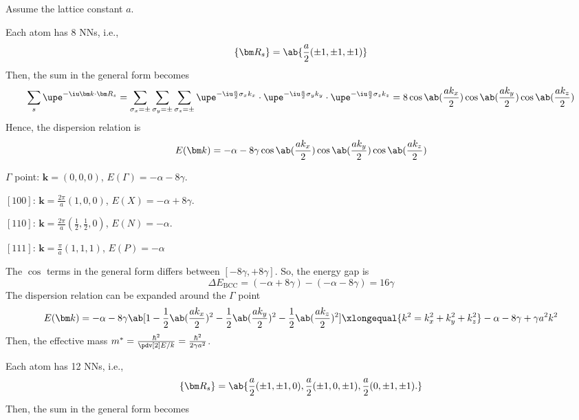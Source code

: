 \begin{solution}[$\text{i} = \text{BCC}$, $\text{ii} = \text{FCC}$]
  Assume the lattice constant $a$.
   \setcounter{case}{1}
  \begin{enumext}[label = (\alph*\textsubscript{\roman{case}})]
    \item Each atom has 8 NNs, i.e.,
    \[
      \{\bm R_s\} = \ab\{\frac a2(\pm1, \pm1, \pm1)\}
    \]
    Then, the sum in the general form becomes
    \[
      \sum_s \upe^{-\iu \bm k \cdot \bm R_s}
    = \sum_{\sigma_x=\pm} \sum_{\sigma_y=\pm} \sum_{\sigma_z=\pm}
      \upe^{-\iu\frac a2\sigma_xk_x} \cdot
      \upe^{-\iu\frac a2\sigma_yk_y} \cdot
      \upe^{-\iu\frac a2\sigma_zk_z}
    = 8\cos\ab(\frac{ak_x}2) \cos\ab(\frac{ak_y}2) \cos\ab(\frac{ak_z}2)
    \]
    Hence, the dispersion relation is
    \[
      E(\bm k) = -\alpha - 8\gamma
      \cos\ab(\frac{ak_x}2) \cos\ab(\frac{ak_y}2) \cos\ab(\frac{ak_z}2)
    \]
    \item \begin{enumext}[columns = 2]
      \item $\Gamma$ point: $\bm k = (0,0,0)$,
      $E(\Gamma) = -\alpha - 8\gamma$.
      \item $[100]$: $\bm k = \frac{2\pi}{a}(1, 0, 0)$,
      $E(X) = -\alpha + 8\gamma$.
      \item $[110]$: $\bm k = \frac{2\pi}{a}(\frac12, \frac12, 0)$,
      $E(N) = -\alpha$.
      \item $[111]$: $\bm k = \frac\pi a(1, 1, 1)$,
      $E(P) = -\alpha$
    \end{enumext}
    \item The $\cos$ terms in the general form differs between
    $[-8\gamma, +8\gamma]$. So, the energy gap is
    \[
      \Delta E_\text{BCC} = (-\alpha + 8\gamma) - (-\alpha - 8\gamma)
    = 16\gamma
    \]
    The dispersion relation can be expanded around the $\Gamma$ point
    \[
      E(\bm k) = -\alpha - 8\gamma\ab[1
        - \frac12\ab(\frac{ak_x}{2})^2
        - \frac12\ab(\frac{ak_y}{2})^2
        - \frac12\ab(\frac{ak_z}{2})^2 ]
    \xlongequal{k^2=k_x^2+k_y^2+k_z^2} -\alpha - 8\gamma + \gamma a^2 k^2
    \]
    Then, the effective mass $m^* = \frac{\hbar^2}{\pdv[2]E/k}
    = \frac{\hbar^2}{2\gamma a^2}$.
    \addtocounter{case}{1} \setcounter{enumXi}{0}
    \item Each atom has 12 NNs, i.e.,
    \[
      \{\bm R_s\} = \ab\{
        \frac a2(\pm1, \pm1, 0),
        \frac a2(\pm1, 0, \pm1),
        \frac a2(0, \pm1, \pm1).
      \}
    \]
    Then, the sum in the general form becomes

\end{enumext}
\end{solution}
